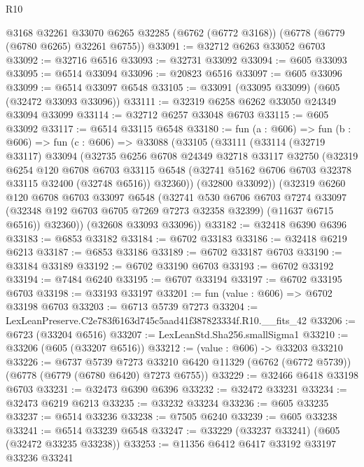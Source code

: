 \begin{lexlean}{R10}
\begin{coremodule}
    @3168
    @32261
    @33070
    @6265
    @32285
    (@6762 (@6772 @3168))
    (@6778 (@6779 (@6780 @6265) @32261 @6755))
@33091 := @32712 @6263 @33052 @6703
@33092 := @32716 @6516
@33093 := @32731 @33092
@33094 := @605 @33093
@33095 := @6514 @33094
@33096 := @20823 @6516
@33097 := @605 @33096
@33099 := @6514 @33097 @6548
@33105 := @33091 (@33095 @33099) (@605 (@32472 @33093 @33096))
@33111 := @32319 @6258 @6262 @33050 @24349 @33094 @33099
@33114 := @32712 @6257 @33048 @6703
@33115 := @605 @33092
@33117 := @6514 @33115 @6548
@33180 := fun (a : @606) =>
  fun (b : @606) =>
  fun (c : @606) =>
  @33088
    (@33105
      (@33111
        (@33114
          (@32719 @33117)
          @33094
          (@32735
            @6256
            @6708
            @24349
            @32718
            @33117
            @32750
            (@32319
              @6254
              @120
              @6708
              @6703
              @33115
              @6548
              (@32741 @5162 @6706 @6703 @32378 @33115 @32400 (@32748 @6516))
              @32360))
          (@32800 @33092))
        (@32319
          @6260
          @120
          @6708
          @6703
          @33097
          @6548
          (@32741
            @530
            @6706
            @6703
            @7274
            @33097
            (@32348 @192 @6703 @6705 @7269 @7273 @32358 @32399)
            (@11637 @6715 @6516))
          @32360))
      (@32608 @33093 @33096))
@33182 := @32418 @6390 @6396
@33183 := @6853 @33182
@33184 := @6702 @33183
@33186 := @32418 @6219 @6213
@33187 := @6853 @33186
@33189 := @6702 @33187 @6703
@33190 := @33184 @33189
@33192 := @6702 @33190 @6703
@33193 := @6702 @33192
@33194 := @7484 @6240
@33195 := @6707 @33194
@33197 := @6702 @33195 @6703
@33198 := @33193 @33197
@33201 := fun (value : @606) => @6702 @33198 @6703
@33203 := @6713 @5739 @7273
@33204 := LexLeanPreserve.C2e783f6163d745c5aad41f387823334f.R10.__fits_42
@33206 := @6723 (@33204 @6516)
@33207 := LexLeanStd.Sha256.smallSigma1
@33210 := @33206 (@605 (@33207 @6516))
@33212 := (value : @606) -> @33203 @33210
@33226 := @6737
    @5739
    @7273
    @33210
    @6420
    @11329
    (@6762 (@6772 @5739))
    (@6778 (@6779 (@6780 @6420) @7273 @6755))
@33229 := @32466 @6418 @33198 @6703
@33231 := @32473 @6390 @6396
@33232 := @32472 @33231
@33234 := @32473 @6219 @6213
@33235 := @33232 @33234
@33236 := @605 @33235
@33237 := @6514 @33236
@33238 := @7505 @6240
@33239 := @605 @33238
@33241 := @6514 @33239 @6548
@33247 := @33229 (@33237 @33241) (@605 (@32472 @33235 @33238))
@33253 := @11356 @6412 @6417 @33192 @33197 @33236 @33241

\end{coremodule}
\end{lexlean}

